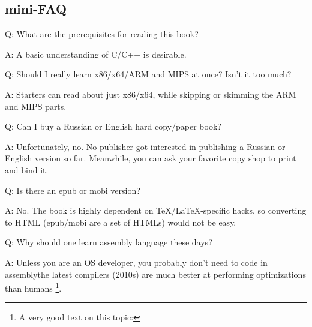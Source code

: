 \subsection*{mini-FAQ}






\par Q: What are the prerequisites for reading this book?
\par A: A basic understanding of C/C++ is desirable.


\par Q: Should I really learn x86/x64/ARM and MIPS at once? Isn't it too much?
\par A: Starters can read about just x86/x64, while skipping or skimming the ARM and MIPS parts.

\par Q: Can I buy a Russian or English hard copy/paper book?
\par A: Unfortunately, no. No publisher got interested in publishing a Russian or English version so far.
Meanwhile, you can ask your favorite copy shop to print and bind it.

\par Q: Is there an epub or mobi version?
\par A: No. The book is highly dependent on TeX/LaTeX-specific hacks, so converting to HTML (epub/mobi are a set of HTMLs)
would not be easy.

\par Q: Why should one learn assembly language these days?
\par A: Unless you are an \ac{OS} developer, you probably don't need to code in assembly\textemdash{}the latest compilers (2010s) are much better at performing optimizations than humans \footnote{A very good text on this topic: \InSqBrackets{\AgnerFog}}.


